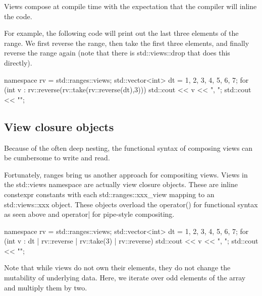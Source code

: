 Views compose at compile time with the expectation that the compiler will inline the code.

For example, the following code will print out the last three elements of the range. We first reverse the range, then take the first three elements, and finally reverse the range again (note that there is std::views::drop that does this directly).

\begin{box-note}
\begin{cppcode}
namespace rv = std::ranges::views;
std::vector<int> dt = {1, 2, 3, 4, 5, 6, 7};
for (int v : rv::reverse(rv::take(rv::reverse(dt),3))) {
    std::cout << v << ", ";
}
std::cout << "\n";
\end{cppcode}
\end{box-note}

\subsection{View closure objects}

Because of the often deep nesting, the functional syntax of composing views can be cumbersome to write and read.

Fortunately, ranges bring us another approach for compositing views. Views in the std::views namespace are actually view closure objects. These are inline constexpr constants with each std::ranges::xxx\_view mapping to an std::views::xxx object. These objects overload the operator() for functional syntax as seen above and operator| for pipe-style compositing.

\begin{box-note}
\begin{cppcode}
namespace rv = std::ranges::views;
std::vector<int> dt = {1, 2, 3, 4, 5, 6, 7};
for (int v : dt | rv::reverse | rv::take(3) | rv::reverse) {
    std::cout << v << ", ";
}
std::cout << "\n";
\end{cppcode}
\end{box-note}

Note that while views do not own their elements, they do not change the mutability of underlying data. Here, we iterate over odd elements of the array and multiply them by two.

\begin{box-note}
\end{box-note}

